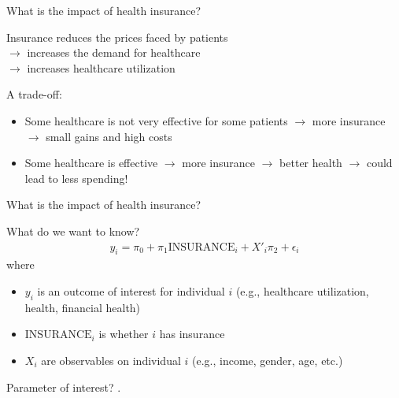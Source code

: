 \begin{frame}{What is the impact of health insurance?}

    Insurance reduces the prices faced by patients\\
    $\rightarrow$ increases the demand for healthcare\\
    $\rightarrow$ increases healthcare utilization\\
    \vspace{5mm}

    A trade-off:
    \begin{itemize}
        \item Some healthcare is not very effective for some patients $\rightarrow$ more insurance $\rightarrow$ small gains and high costs
        \item Some healthcare is effective $\rightarrow$ more insurance $\rightarrow$ better health $\rightarrow$ could lead to less spending!
    \end{itemize}

\end{frame}
\begin{frame}{What is the impact of health insurance?}

    What do we want to know?
    \begin{align*}
        y_{i} = \pi_0 + \pi_1 \text{INSURANCE}_i + X'_{i} \pi_2 + \epsilon_{i}
    \end{align*}
    where
    \begin{itemize}
        \item $y_i$ is an outcome of interest for individual $i$ (e.g., healthcare utilization, health, financial health)
        \item $\text{INSURANCE}_i$ is whether $i$ has insurance
        \item $X_i$ are observables on individual $i$ (e.g., income, gender, age, etc.)
    \end{itemize}
    \vspace{2mm}

    Parameter of interest? .
    
\end{frame}
